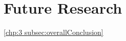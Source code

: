 \documentclass[../Dissertation]{subfiles}
\begin{document}
\section{Future Research}\label{sec:future_research}
    \lipsum[64-65]
    
    \lipsum[64] \cref{chp:3 subsec:overallConclusion} \lipsum[64]
    
    \lipsum[64]
\end{document}
